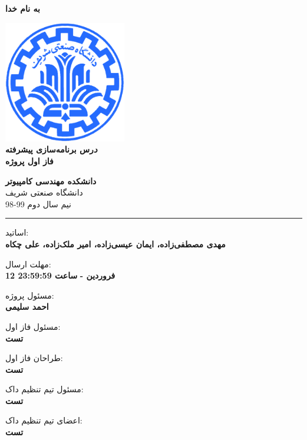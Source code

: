 \documentclass[]{article}
\begin{document}
\begin{titlepage}
\begin{center}

\textbf{ \Huge{به نام خدا} }
        
\vspace{0.2cm}

\includegraphics[width=0.4\textwidth]{sharif1.png}\\
\vspace{0.2cm}
\textbf{ \Huge{\emph درس برنامه‌سازی پیشرفته} }\\
\vspace{0.25cm}
\textbf{ \Large{ فاز اول پروژه} }
\vspace{0.2cm}
       
 
      \large \textbf{دانشکده مهندسی کامپیوتر}\\\vspace{0.1cm}
    \large   دانشگاه صنعتی شریف\\\vspace{0.2cm}
       \large   ﻧﯿﻢ سال دوم 99-98 \\\vspace{0.10cm}
      \noindent\rule[1ex]{\linewidth}{1pt}
اساتید:\\
    \textbf{{مهدی مصطفی‌زاده، ایمان عیسی‌زاده، امیر ملک‌زاده، علی چکاه}}



    \vspace{0.20cm}

   مهلت ارسال:\\
    \textbf{{12 فروردین - }}
    \textbf{{ساعت 23:59:59}}

    \vspace{0.10cm}
مسئول پروژه:\\
    \textbf{{احمد سلیمی}}
    
        \vspace{0.10cm}
مسئول فاز اول:\\
    \textbf{{تست}}
    
        \vspace{0.10cm}
طراحان فاز اول:\\
    \textbf{{تست}}
    
        \vspace{0.05cm}
مسئول تیم تنظیم داک:\\
    \textbf{{تست}}
    
            \vspace{0.05cm}
اعضای تیم تنظیم داک:\\
    \textbf{{تست}}
\end{center}
\end{titlepage}
\end{document}
